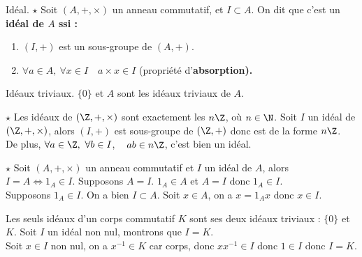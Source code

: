 \documentclass[11pt]{article}
\begin{document}
\vspace*{-0.8cm}

\begin{defi}{Idéal. $\star$}{}
    Soit $(A,+,\times)$ un anneau commutatif, et $I\subset A$. On dit que c'est un \bf{idéal} de $A$ ssi :
    \begin{enumerate}
        \item $(I,+)$ est un sous-groupe de $(A,+)$.
        \item $\forall a \in A, ~ \forall x \in I \quad a\times x \in I$ (propriété d'\bf{absorption}).
    \end{enumerate}
\end{defi}

\begin{ex}{Idéaux triviaux.}{}
    $\{0\}$ et $A$ sont les idéaux triviaux de $A$.
\end{ex}

\vspace*{-0.7cm}

\begin{prop}{$\star$}{}
    Les idéaux de $(\Z,+,\times)$ sont exactement les $n\Z$, où $n\in\N$.
    \tcblower
    Soit $I$ un idéal de $(\Z,+,\times)$, alors $(I,+)$ est sous-groupe de $(\Z,+)$ donc est de la forme $n\Z$.\\
    De plus, $\forall a \in \Z, ~ \forall b \in I$, ~ $ab\in n\Z$, c'est bien un idéal. 
\end{prop}

\vspace*{-0.7cm}

\begin{prop}{$\star$}{}
    Soit $(A,+,\times)$ un anneau commutatif et $I$ un idéal de $A$, alors $I=A \iff 1_A\in I$.
    \tcblower
    \boxed{\ra} Supposons $A=I$. $1_A\in A$ et $A=I$ donc $1_A\in I$.\\
    \boxed{\la} Supposons $1_A\in I$. On a bien $I\subset A$. Soit $x\in A$, on a $x=1_A x$ donc $x\in I$. 
\end{prop}

\vspace*{-0.7cm}

\begin{ex}{}{}
    Les seuls idéaux d'un corps commutatif $K$ sont ses deux idéaux triviaux : $\{0\}$ et $K$.
    \tcblower
    Soit $I$ un idéal non nul, montrons que $I=K$.\\
    Soit $x\in I$ non nul, on a $x^{-1}\in K$ car corps, donc $xx^{-1}\in I$ donc $1\in I$ donc $I=K$.
\end{ex}
\end{document}

